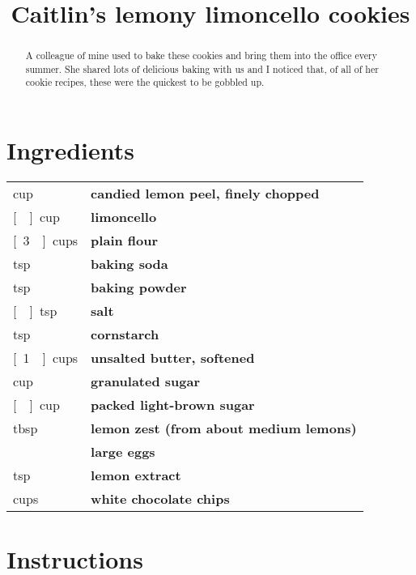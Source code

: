 \documentclass[main.tex]{subfiles}
\title{Caitlin's lemony limoncello cookies}
\begin{document}
\maketitle

\begin{abstract}
A colleague of mine used to bake these cookies and bring them into the office every summer. She shared lots of delicious baking with us and I noticed that, of all of her cookie recipes, these were the quickest to be gobbled up. 
\end{abstract}

\section{Ingredients}

\vspace*{-\baselineskip}
\begin{table}[ht]
	\begin{tabularx}{\textwidth}{>{\hsize=0.333\hsize}X>{\bf\hsize=1\hsize}X}
	\unit[1]{cup} & candied lemon peel, finely chopped\\
	\unit[\nicefrac{1}{4}]{cup} & limoncello \\
	\unit[3\nicefrac{1}{3}]{cups} & plain flour\\
	\unit[1]{tsp} & baking soda\\
	\unit[1]{tsp} & baking powder\\
	\unit[\nicefrac{1}{2}]{tsp} & salt\\
	\unit[3]{tsp} & cornstarch\\
	\unit[1\nicefrac{1}{2}]{cups} & unsalted butter, softened\\
	\unit[1]{cup} & granulated sugar \\
	\unit[\nicefrac{2}{3}]{cup} & packed light-brown sugar \\
	\unit[3]{tbsp} & lemon zest (from about \unit[5]{} medium lemons)  \\
	\unit[2]{} & large eggs \\
	\unit[3]{tsp} & lemon extract\\
	\unit[2]{cups} & white chocolate chips \\
	\end{tabularx}
\end{table}

\section{Instructions}
\end{document}
